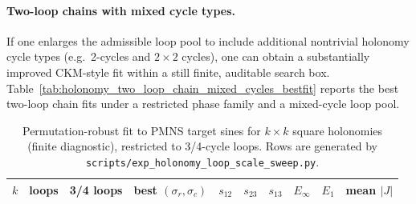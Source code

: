 \paragraph{Two-loop chains with mixed cycle types.}
If one enlarges the admissible loop pool to include additional nontrivial holonomy cycle types (e.g.\ 2-cycles and $2\times 2$ cycles), one can obtain a substantially improved CKM-style fit within a still finite, auditable search box.
Table~\ref{tab:holonomy_two_loop_chain_mixed_cycles_bestfit} reports the best two-loop chain fits under a restricted phase family and a mixed-cycle loop pool.

\begin{table}[t]
\centering
\scriptsize
\setlength{\tabcolsep}{3pt}
\renewcommand{\arraystretch}{1.15}
%
\caption{Best two-loop chain fits to PMNS/CKM target sines under a bounded scan over mixed-cycle square loops (cycle types in \texttt{\{2,2x2,3,4\}}), with a restricted phase family (map \texttt{\{id,gray\}}, denom $\in\{256,512,1024\}$) and a global relabeling in $S_3\times S_3$. Rows are generated by \texttt{scripts/exp\_holonomy\_two\_loop\_chain\_mixed\_cycles\_bestfit.py}.}
\label{tab:holonomy_two_loop_chain_mixed_cycles_bestfit}
\end{table}

\begin{table}[t]
\centering
\scriptsize
\setlength{\tabcolsep}{4pt}
\renewcommand{\arraystretch}{1.15}
\begin{tabular}{rrrrrrrrrr}
\toprule
$k$ & loops & 3/4 loops & best $(\sigma_r,\sigma_c)$ & $s_{12}$ & $s_{23}$ & $s_{13}$ & $E_\infty$ & $E_1$ & mean $|J|$ \\
\midrule
%
\end{tabular}
\caption{Permutation-robust fit to PMNS target sines for $k\times k$ square holonomies (finite diagnostic), restricted to 3/4-cycle loops. Rows are generated by \texttt{scripts/exp\_holonomy\_loop\_scale\_sweep.py}.}
\label{tab:holonomy_loop_scale_fit_pmns}
\end{table}

